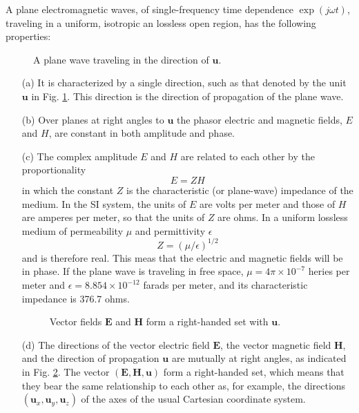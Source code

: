 A plane electromagnetic waves, of single-frequency time dependence $\exp(j\omega t)$, traveling in a uniform, isotropic an lossless open region, has the following properties:
\begin{figure}[htbp]
	\begin{center}
	\end{center}
	\caption{A plane wave traveling in the direction of $\mathbf{u}$.}
	\label{fig:pwtrav}
\end{figure}
\begin{itemize}
	\item [(a)]
	It is characterized by a single direction, such as that denoted by the unit $\mathbf{u}$ in Fig. \ref{fig:pwtrav}. This direction is the direction of propagation of the plane wave.
	\item [(b)]
	Over planes at right angles to $\mathbf{u}$ the phasor electric and magnetic fields, $E$ and $H$, are constant in both amplitude and phase.
	\item [(c)]
	The complex amplitude $E$ and $H$ are related to each other by the proportionality
	\begin{equation}
	E=ZH
	\end{equation}
	in which the constant $Z$ is the characteristic (or plane-wave) impedance of the medium. In the SI system, the units of $E$ are volts per meter and those of $H$ are amperes per meter, so that the units of $Z$ are ohms. In a uniform lossless medium of permeability $\mu$ and permittivity $\epsilon$
	\begin{equation}
	Z=(\mu/\epsilon)^{1/2}
	\end{equation}
	and is therefore real. This meas that the electric and magnetic fields will be in phase. If the plane wave is traveling in free space, $\mu=4\pi \times 10^{-7}$ heries per meter and $\epsilon=8.854\times10^{-12}$ farads per meter, and its characteristic impedance is 376.7 ohms.
	\begin{figure}[htbp]
		\begin{center}
		\end{center}
		\caption{Vector fields $\mathbf{E}$ and $\mathbf{H}$ form a right-handed set with $\mathbf{u}$.}
		\label{fig:rhs}
	\end{figure}
	\item [(d)]
	The directions of the vector electric field $\mathbf{E}$, the vector magnetic field $\mathbf{H}$, and the direction of propagation $\mathbf{u}$ are mutually at right angles, as indicated in Fig. \ref{fig:rhs}. The vector $(\mathbf{E},\mathbf{H},\mathbf{u})$ form a right-handed set, which means that they bear the same relationship to each other as, for example, the directions $(\mathbf{u}_x,\mathbf{u}_y,\mathbf{u}_z)$ of the axes of the usual Cartesian coordinate system.\\

\end{itemize}
